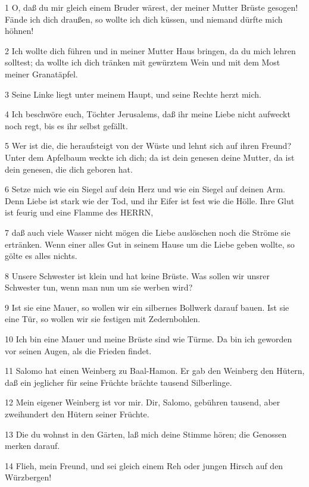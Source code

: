 \par 1 O, daß du mir gleich einem Bruder wärest, der meiner Mutter Brüste gesogen! Fände ich dich draußen, so wollte ich dich küssen, und niemand dürfte mich höhnen!
\par 2 Ich wollte dich führen und in meiner Mutter Haus bringen, da du mich lehren solltest; da wollte ich dich tränken mit gewürztem Wein und mit dem Most meiner Granatäpfel.
\par 3 Seine Linke liegt unter meinem Haupt, und seine Rechte herzt mich.
\par 4 Ich beschwöre euch, Töchter Jerusalems, daß ihr meine Liebe nicht aufweckt noch regt, bis es ihr selbst gefällt.
\par 5 Wer ist die, die heraufsteigt von der Wüste und lehnt sich auf ihren Freund? Unter dem Apfelbaum weckte ich dich; da ist dein genesen deine Mutter, da ist dein genesen, die dich geboren hat.
\par 6 Setze mich wie ein Siegel auf dein Herz und wie ein Siegel auf deinen Arm. Denn Liebe ist stark wie der Tod, und ihr Eifer ist fest wie die Hölle. Ihre Glut ist feurig und eine Flamme des HERRN,
\par 7 daß auch viele Wasser nicht mögen die Liebe auslöschen noch die Ströme sie ertränken. Wenn einer alles Gut in seinem Hause um die Liebe geben wollte, so gölte es alles nichts.
\par 8 Unsere Schwester ist klein und hat keine Brüste. Was sollen wir unsrer Schwester tun, wenn man nun um sie werben wird?
\par 9 Ist sie eine Mauer, so wollen wir ein silbernes Bollwerk darauf bauen. Ist sie eine Tür, so wollen wir sie festigen mit Zedernbohlen.
\par 10 Ich bin eine Mauer und meine Brüste sind wie Türme. Da bin ich geworden vor seinen Augen, als die Frieden findet.
\par 11 Salomo hat einen Weinberg zu Baal-Hamon. Er gab den Weinberg den Hütern, daß ein jeglicher für seine Früchte brächte tausend Silberlinge.
\par 12 Mein eigener Weinberg ist vor mir. Dir, Salomo, gebühren tausend, aber zweihundert den Hütern seiner Früchte.
\par 13 Die du wohnst in den Gärten, laß mich deine Stimme hören; die Genossen merken darauf.
\par 14 Flieh, mein Freund, und sei gleich einem Reh oder jungen Hirsch auf den Würzbergen!

